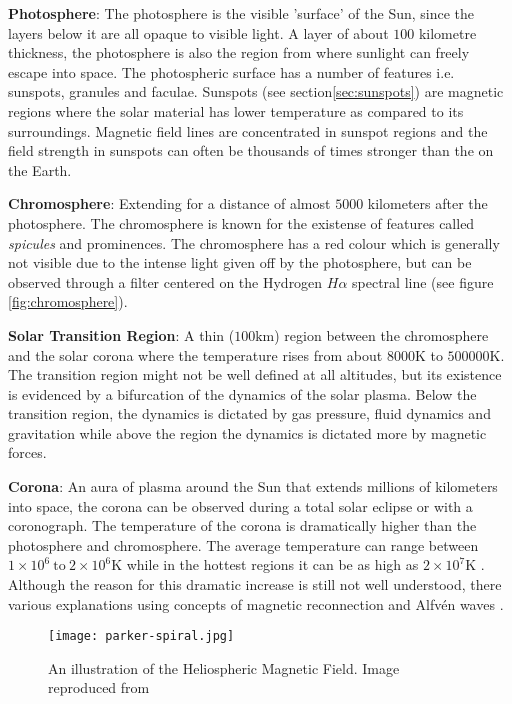 \textbf{Photosphere}: The photosphere is the visible 'surface' of the Sun, since the layers below it are all opaque to visible light.
A layer of about $100$ kilometre thickness, the photosphere is also the region from where sunlight can freely 
escape into space. The photospheric surface has a number of features i.e. sunspots, granules and faculae. 
Sunspots (see section\ref{sec:sunspots}) are magnetic regions where the solar material has lower temperature as compared to its surroundings. 
Magnetic field lines are concentrated in sunspot regions and the field strength in sunspots can often be thousands 
of times stronger than the on the Earth.

\textbf{Chromosphere}: Extending for a distance of almost $5000$ kilometers after the photosphere. The chromosphere is known for the 
existense of features called \emph{spicules} and prominences. The chromosphere has a red colour which 
is generally not visible due to the intense light given off by the photosphere, but can be observed through 
a filter centered on the Hydrogen $H\alpha$ spectral line (see figure \ref{fig:chromosphere}). 

\textbf{Solar Transition Region}: A thin ($100 \text{km}$) region between the chromosphere and the solar corona 
where the temperature rises from about $8000 \text{K}$ to $500000 \text{K}$. The transition region might not be well 
defined at all altitudes, but its existence is evidenced by a bifurcation of the dynamics of the solar plasma. 
Below the transition region, the dynamics is dictated by gas pressure, fluid dynamics and gravitation while 
above the region the dynamics is dictated more by magnetic forces.

\textbf{Corona}: An aura of plasma around the Sun that extends millions of kilometers into space, the corona can be observed 
during a total solar eclipse or with a coronograph. The temperature of the corona is dramatically higher 
than the photosphere and chromosphere. The average temperature can range between 
$1 \times 10^6 \ \text{to} \ 2 \times 10^6 \text{K}$ while in the hottest regions it can be as high as 
$2 \times 10^7 \text{K}$ \citep{SolarCorona}. Although the reason for this dramatic increase is still 
not well understood, there various explanations using concepts of magnetic reconnection 
\citep{russell2001solar,SolarCorona} and Alfv\'en waves \citep{AlfvenCorona}.

\begin{figure}
    \noindent\texttt{[image: parker-spiral.jpg]}
    \caption{\small An illustration of the Heliospheric Magnetic Field. Image reproduced from \citet{Owens2013}}
    \label{fig:parkerspiral}
\end{figure}

